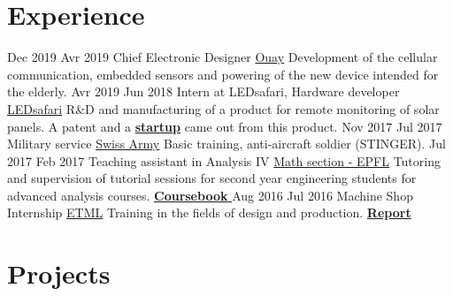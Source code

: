 \documentclass[a4paper]{twentysecondcv} %
\begin{document}
\section{Experience}
\vspace*{-0.1cm}

\begin{twenty} %
    \twentyitem
    	{Dec 2019}
		{Avr 2019}
        {Chief Electronic Designer}
        {\href{https://www.ouay.ch/}{Ouay}}
        {Development of the cellular communication, embedded sensors and powering of the new device intended for the elderly.}
        {}
    \twentyitem
    	{Avr 2019}
		{Jun 2018}
        {Intern at LEDsafari, Hardware developer}
        {\href{http://ledsafari.com/remote-monitoring/}{LEDsafari}}
        {
        R\&D and manufacturing of a product for remote monitoring of solar panels. A patent and a  \href{https://www.smarthelio.com/}{\textbf{startup}} came out from this product.
        }
        {}
    \twentyitem
    	{Nov 2017}
		{Jul 2017}
        {Military service}
        {\href{https://www.vtg.admin.ch/fr/moyens-d-engagement/boden-luft/stinger.html}{Swiss Army}}
        {
        Basic training, anti-aircraft soldier (STINGER).
        }
        {}
	\twentyitem
    	{Jul 2017}
		{Feb 2017}
        {Teaching assistant in Analysis IV}
        {\href{http://edu.epfl.ch/coursebook/fr/analyse-iv-MATH-207-D}{Math section - EPFL}}
        {
        Tutoring and supervision of tutorial sessions for second year engineering students for advanced analysis courses. \hfill
        \href{http://fdeg.ch/Reports/Coursebook_Analyse_IV.pdf}{\textbf{Coursebook \mpoint}}
        }
        {}
    \twentyitem
   		{Aug 2016}
		{Jul 2016}
        {Machine Shop Internship}
        {\href{https://www.etml.ch/}{ETML}}
        {Training in the fields of design and production. \hfill
        \href{http://fdeg.ch/Reports/ETML_Machine_Shop.pdf}{\textbf{Report \mpoint}} 
        }
        {}
    
\end{twenty}

\vspace*{-0.3cm}
\section{Projects}
\vspace*{-0.1cm}
\end{document}
